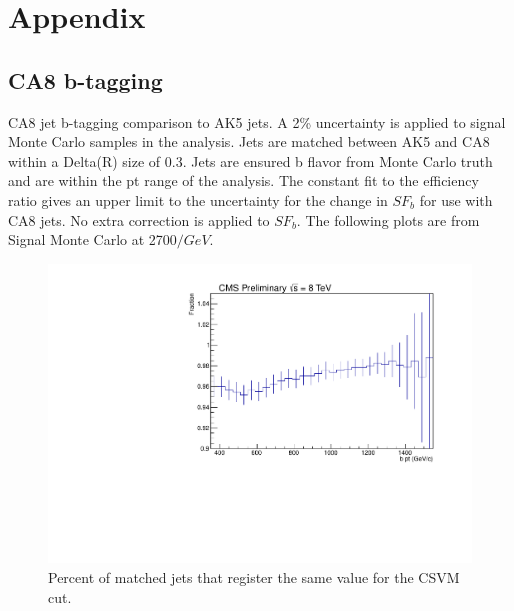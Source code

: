 \chapter{Appendix}
\label{sec:appendix}
\section{CA8 b-tagging}
\label{sec:ca8toak5}


CA8 jet b-tagging comparison to AK5 jets. A 2\% uncertainty is applied to signal Monte Carlo samples in the analysis.  Jets are matched between AK5 and CA8 
within a Delta(R) size of 0.3.
Jets are ensured b flavor from Monte Carlo truth and are within the pt range of the analysis.  The constant fit to the efficiency ratio gives an upper limit to the uncertainty 
for the change in $SF_b$ for use with CA8 jets.  No extra correction is applied to $SF_b$.  The following plots are from Signal Monte Carlo at 2700$/GeV$. 

\begin{figure}[Htcb]
\centering
\includegraphics[width=1.0\textwidth]{figs/bpercentr32700.pdf}
\caption{Percent of matched jets that register the same value for the CSVM cut.}
\label{figs:bpercent}
\end{figure}

